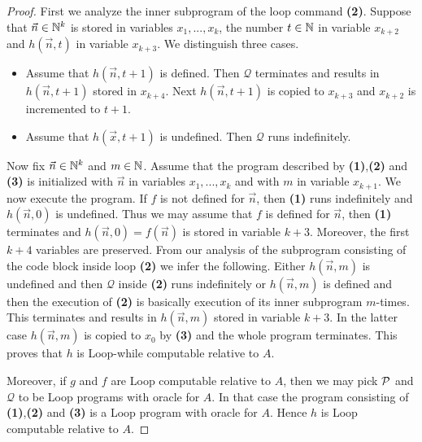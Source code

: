\documentclass[10pt]{amsart}
\begin{document}
\begin{proof}
	First we analyze the inner subprogram of the loop command \textbf{(2)}. Suppose that $\vec{n}\in {\mathbb N}^k$ is stored in variables $x_1,...,x_k$, the number $t \in {\mathbb N}$ in variable $x_{k + 2}$ and $h(\vec{n},t)$ in variable $x_{k + 3}$. We distinguish three cases.
	\begin{itemize}
		\item Assume that $h(\vec{n},t + 1)$ is defined. Then $\mathcal{Q}$ terminates and results in $h(\vec{n},t + 1)$ stored in $x_{k + 4}$. Next $h(\vec{n},t + 1)$ is copied to $x_{k+3}$ and $x_{k+2}$ is incremented to $t + 1$.
		\item Assume that $h(\vec{x},t + 1)$ is undefined. Then $\mathcal{Q}$ runs indefinitely.
	\end{itemize}
	Now fix $\vec{n} \in {\mathbb N}^k$ and $m \in {\mathbb N}$. Assume that the program described by \textbf{(1)},\textbf{(2)} and \textbf{(3)} is initialized with $\vec{n}$ in variables $x_1,...,x_k$ and with $m$ in variable $x_{k + 1}$. We now execute the program. If $f$ is not defined for $\vec{n}$, then \textbf{(1)} runs indefinitely and $h(\vec{n},0)$ is undefined. Thus we may assume that $f$ is defined for $\vec{n}$, then \textbf{(1)} terminates and $h(\vec{n},0) = f(\vec{n})$ is stored in variable $k + 3$. Moreover, the first $k + 4$ variables are preserved. From our analysis of the subprogram consisting of the code block inside loop \textbf{(2)} we infer the following. Either $h(\vec{n},m)$ is undefined and then $\mathcal{Q}$ inside \textbf{(2)} runs indefinitely or $h(\vec{n},m)$ is defined and then the execution of \textbf{(2)} is basically execution of its inner subprogram $m$-times. This terminates and results in $h(\vec{n},m)$ stored in variable $k + 3$. In the latter case $h(\vec{n},m)$ is copied to $x_0$ by \textbf{(3)} and the whole program terminates. This proves that $h$ is Loop-while computable relative to $A$.

	Moreover, if $g$ and $f$ are Loop computable relative to $A$, then we may pick ${\mathcal P}$ and $\mathcal{Q}$ to be Loop programs with oracle for $A$. In that case the program consisting of \textbf{(1)},\textbf{(2)} and \textbf{(3)} is a Loop program with oracle for $A$. Hence $h$ is Loop computable relative to $A$.
\end{proof}
\end{document}
